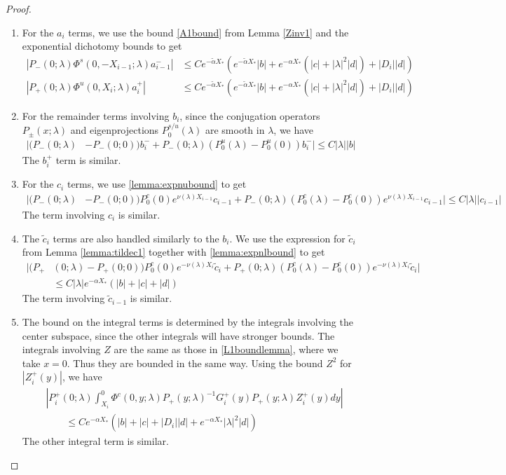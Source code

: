 \documentclass[thesis.tex]{subfiles}
\begin{document}
\begin{lemma}
\begin{proof}
\begin{enumerate}
\item For the $a_i$ terms, we use the bound \eqref{A1bound} from Lemma \ref{Zinv1} and the exponential dichotomy bounds to get
\begin{align*}
|P_-(0; \lambda) \Phi^s(0, -X_{i-1}; \lambda) a_{i-1}^-| 
&\leq C e^{-\tilde{\alpha} X_*} \left( e^{-\tilde{\alpha} X_*} |b|  + e^{-\alpha X_*}(|c| + |\lambda|^2 |d|) + |D_i||d| \right)\\
|P_+(0; \lambda) \Phi^u(0, X_i; \lambda) a_i^+| 
&\leq C e^{-\tilde{\alpha} X_*} \left( e^{-\tilde{\alpha} X_*} |b|  + e^{-\alpha X_*}(|c| + |\lambda|^2 |d|) + |D_i||d| \right)
\end{align*}

\item For the remainder terms involving $b_i$, since the conjugation operators $P_\pm(x; \lambda)$ and eigenprojections $P_0^{s/u}(\lambda)$ are smooth in $\lambda$, we have
\begin{align*}
|(P_-(0; \lambda) &- P_-(0; 0))b_i^- + P_-(0; \lambda)(P_0^u(\lambda) - P_0^u(0))b_i^-| \leq C |\lambda| |b|
\end{align*}
The $b_i^+$ term is similar. 

\item For the $c_i$ terms, we use \cref{lemma:expnubound} to get
\begin{align*}
|(P_-(0; \lambda) &- P_-(0; 0)) P_0^c(0) e^{\nu(\lambda) X_{i-1}} c_{i-1} + P_-(0; \lambda) (P_0^c(\lambda) - P_0^c(0)) e^{\nu(\lambda) X_{i-1}} c_{i-1} | \leq C |\lambda|| c_{i-1} |
\end{align*}
The term involving $c_i$ is similar.

\item The $\tilde{c}_i$ terms are also handled  similarly to the $b_i$. We use the expression for $\tilde{c}_i$ from Lemma \ref{lemma:tildec1} together with \cref{lemma:expnlbound} to get
\begin{align*}
|(P_+&(0; \lambda) - P_+(0; 0))P_0^c(0) e^{-\nu(\lambda)X_i} \tilde{c}_i + P_+(0; \lambda) (P_0^c(\lambda) - P_0^c(0)) e^{-\nu(\lambda)X_i} \tilde{c}_i| \\
&\leq C |\lambda| e^{-\alpha X_*} \left( |b| + |c| + |d| \right)
\end{align*}
The term involving $\tilde{c}_{i-1}$ is similar.

\item The bound on the integral terms is determined by the integrals involving the center subspace, since the other integrals will have stronger bounds. The integrals involving $Z$ are the same as those in \cref{L1boundlemma}, where we take $x = 0$. Thus they are bounded in the same way. Using the bound $Z^2$ for $| Z_i^+(y)|$, we have 
\begin{align*}
&\left| P_i^+(0; \lambda) \int_{X_i}^0 \Phi^c(0, y; \lambda) P_+(y; \lambda)^{-1} G_i^+(y) P_+(y; \lambda) Z_i^+(y) dy \right| \\
&\qquad \leq C e^{-\alpha X_*} \left(|b| + |c| + |D_i||d| + e^{-\alpha X_*}|\lambda|^2|d|\right)
\end{align*}
The other integral term is similar.


\end{enumerate}
\end{proof}
\end{lemma}
\end{document}
